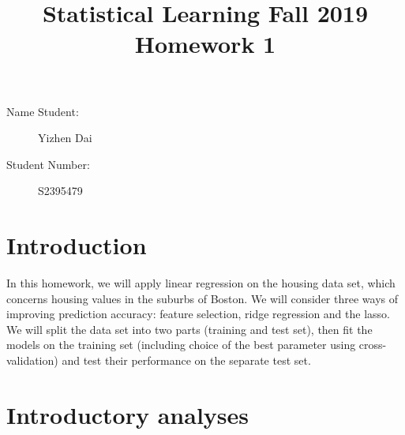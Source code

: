 \documentclass[11pt,a4paper]{article}
\title{Statistical Learning Fall 2019\\ Homework 1\\}
\date{\vspace{-5ex}}
\begin{document}
\maketitle


\begin{description}
\item[Name Student:] Yizhen Dai
\item[Student Number:] S2395479
\end{description}


\section*{Introduction}

In this homework, we will apply linear regression on the housing data set, which concerns housing values in the suburbs of Boston. We will consider three ways of improving prediction accuracy: feature selection, ridge regression and the lasso. We will split the data set into two parts (training and test set), then fit the models on the training set (including choice of the best parameter using cross-validation) and test their performance on the separate test set.

\section*{Introductory analyses}
\end{document}
